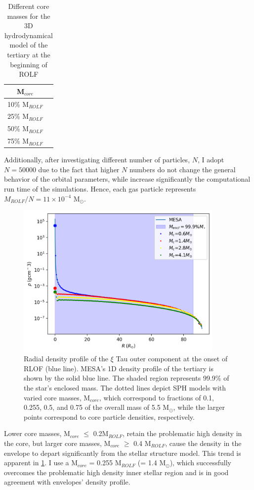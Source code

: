 \begin{table}[H]
    \centering
    \begin{tabular}{| c | c |}
       M$_{core}$  \\
       \hline
       10\% M$_{ROLF}$\\
       25\% M$_{ROLF}$\\
       50\% M$_{ROLF}$\\
       75\% M$_{ROLF}$
    \end{tabular}
    \caption{ Different core masses for the 3D hydrodynamical model of the tertiary at the beginning of ROLF}
    \label{tab:core_masses_ROLF}
\end{table}

Additionally, after investigating different number of particles, $N$, I adopt $N=50000$ due to the fact that higher $N$ numbers do not change the general behavior of the orbital parameters, while increase significantly the computational run time of the simulations.  Hence, each gas particle represents $M_{ROLF}/N = 11 \times 10^{-4}$ M$_{\odot}$.


\begin{figure}[H]
    \centering
    \includegraphics[width=0.9\textwidth]{Thesis/graphs/ROLF_density_profile.pdf}
    \caption{Radial density profile of the  $\xi$ Tau outer component at the onset of RLOF (blue line). MESA's 1D density profile of the tertiary is shown by the solid blue line. The shaded region represents 99.9\% of the star's enclosed mass. The dotted lines depict SPH models with varied core masses, M$_{core}$, which correspond to fractions of 0.1, 0.255, 0.5, and 0.75 of the overall mass of 5.5 M$_{\odot}$, while the larger points correspond to core particle densities, respectively.}
    \label{fig:stellar_density_ROLF}
\end{figure}

Lower core masses, M$_{core}$ $\leq$ 0.2M$_{ROLF}$, retain the problematic high density in the core, but larger core masses, M$_{core}$ $\geq$ 0.4 M$_{ROLF}$, cause the density in the envelope to depart significantly from the stellar structure model. This trend is apparent in \cref{fig:stellar_density_ROLF}. I use a M$_{core}$ = 0.255 M$_{ROLF}$ (= 1.4 M$_{\odot}$), which successfully overcomes the problematic high density inner stellar region and is in good agreement with envelopes' density profile.

